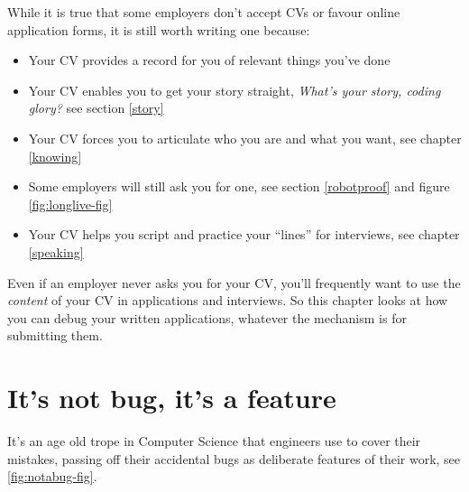 \documentclass[
]{book}
\providecommand{\tightlist}{%
  \setlength{\itemsep}{0pt}\setlength{\parskip}{0pt}}
\begin{document}
While it is true that some employers don't accept CVs or favour online application forms, it is still worth writing one because:

\begin{itemize}
\tightlist
\item
  Your CV provides a record for you of relevant things you've done
\item
  Your CV enables you to get your story straight, \emph{What's your story, coding glory?} see section \ref{story}
\item
  Your CV forces you to articulate who you are and what you want, see chapter \ref{knowing}
\item
  Some employers will still ask you for one, see section \ref{robotproof} and figure \ref{fig:longlive-fig}
\item
  Your CV helps you script and practice your ``lines'' for interviews, see chapter \ref{speaking}
\end{itemize}

Even if an employer never asks you for your CV, you'll frequently want to use the \emph{content} of your CV in applications and interviews. So this chapter looks at how you can debug your written applications, whatever the mechanism is for submitting them.

\hypertarget{trope}{%
\section{It's not bug, it's a feature}\label{trope}}

It's an age old trope in Computer Science that engineers use to cover their mistakes, passing off their accidental bugs as deliberate features of their work, see \ref{fig:notabug-fig}.
\end{document}

